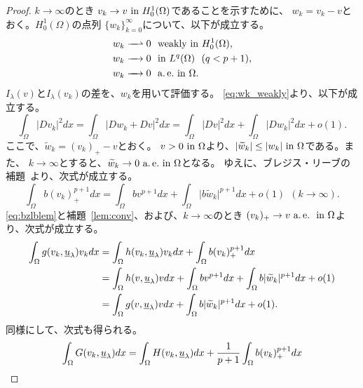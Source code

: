 \begin{proof}
 $k \to \infty$のとき
 $v_k \to v ~\tin H_0^1(\Omega)$であることを示すために、
 $w_k = v_k - v$とおく。$H_0^1(\Omega)$の点列
 $\{ w_k \}_{k=0}^\infty$について、以下が成立する。
 \begin{align}
  w_k \xrightharpoonup{ \mbox{ ~ } } 0 & \ \ \text{weakly~} \tin
  H_0^1(\Omega), \label{eq:wk_weakly} \\
  w_k \xrightarrow{ \mbox{ ~ } } 0 & \ \ \tin L^q(\Omega) \ \
  (q < p+1), \label{eq:wk_Lq} \\
  w_k \xrightarrow{ \mbox{ ~ } } 0 & \ \ \ae \tin \Omega. 
  \label{eq:wk_ae}
 \end{align}
 $I_\lambda(v)$と$I_\lambda(v_k)$の差を、$w_k$を用いて評価する。
 \eqref{eq:wk_weakly}より、以下が成立する。
 \begin{equation}
  \int_\Omega \lvert D v_k \rvert^2 dx = \int_\Omega \lvert Dw_k + Dv
   \rvert^2 dx = \int_\Omega \lvert Dv \rvert^2 dx + \int_\Omega \lvert
   Dw_k \rvert^2 dx + o(1). \label{eq:Dvk_Dwk}
 \end{equation}
 ここで、$\tilde{w}_k = (v_k)_+ - v$とおく。
 $v > 0 ~\tin \Omega$より、$\lvert \tilde{w}_k \rvert \leq \lvert w_k
 \rvert ~\tin \Omega$である。また、
 $k \to \infty$とすると、$\tilde{w}_k \to 0 ~\ae \tin \Omega$となる。
 ゆえに、ブレジス・リーブの補題~\cite{MR699419}より、次式が成立する。
 \begin{equation}
  \int_\Omega b(v_k)_{+}^{p+1} dx = \int_\Omega bv^{p+1} dx +
   \int_\Omega \lvert b\tilde{w}_k \rvert^{p+1} dx + o(1) \ \ (k \to
   \infty).
   \label{eq:bzlblem}
 \end{equation}
 \eqref{eq:bzlblem}と補題~\ref{lem:conv}、および、$k \to \infty$のとき
 $(v_k)_+ \to v ~\ae ~\tin \Omega$より、次式が成立する。
 \begin{align}
  \int_\Omega g(v_k, \underline{u}_\lambda) v_k dx &= \int_\Omega
  h(v_k, \underline{u}_\lambda) v_k dx + \int_\Omega b (v_k)_+^{p+1}
  dx \notag \\
  &= \int_\Omega
  h(v, \underline{u}_\lambda) v dx + \int_\Omega b v^{p+1}
  dx + \int_\Omega b \lvert \tilde{w}_k \lvert^{p+1} dx + o(1) \notag \\
  &= \int_\Omega g(v, \underline{u}_\lambda) v dx + 
  \int_\Omega b \lvert \tilde{w}_k \lvert^{p+1} dx + o(1). \label{eq:w_k_1}
 \end{align}
 同様にして、次式も得られる。
 \begin{align}
  \int_\Omega G(v_k, \underline{u}_\lambda) dx &= 
  \int_\Omega H(v_k, \underline{u}_\lambda) dx + \frac{1}{p+1}
  \int_\Omega b (v_k)_+^{p+1} dx \notag \\

\end{align}
\end{proof}
